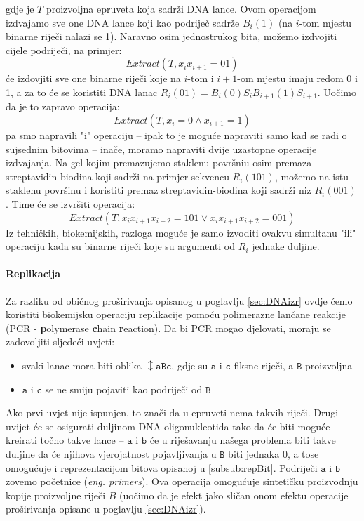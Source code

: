 \documentclass[a4paper,oneside,12pt]{memoir} %
\begin{document}
\begin{spacing}{1.5}
gdje je $T$ proizvoljna epruveta koja sadrži DNA lance. Ovom operacijom izdvajamo sve one DNA lance koji kao podriječ sadrže $B_i(1)$ (na $i$-tom mjestu binarne riječi nalazi se 1). Naravno osim jednostrukog bita, možemo izdvojiti cijele podriječi, na primjer:
\[Extract(T, x_ix_{i+1}=01)\] 
će izdovjiti sve one binarne riječi koje na $i$-tom i $i+1$-om mjestu imaju redom 0 i 1, a za to će se koristiti DNA lanac $R_i(01)=B_i(0)S_{i}B_{i+1}(1)S_{i+1}$. Uočimo da je to zapravo operacija:
\[Extract(T, x_i=0 \wedge x_{i+1}=1)\]
pa smo napravili "i" operaciju -- ipak to je moguće napraviti samo kad se radi o sujsednim bitovima -- inače, moramo napraviti dvije uzastopne operacije izdvajanja. Na gel kojim premazujemo staklenu površniu osim premaza streptavidin-biodina koji sadrži na primjer sekvencu $R_i(101)$, možemo na istu staklenu površinu i koristiti premaz streptavidin-biodina koji sadrži niz $R_i(001)$. Time će se izvršiti operacija:
\[Extract(T, x_ix_{i+1}x_{i+2}=101 \vee x_ix_{i+1}x_{i+2}=001)\] 
Iz tehničkih, biokemijskih, razloga moguće je samo izvoditi ovakvu simultanu "ili" operaciju kada su binarne riječi koje su argumenti od $R_i$ jednake duljine.
\paragraph{Replikacija} Za razliku od običnog proširivanja opisanog u poglavlju \ref{sec:DNAizr} ovdje ćemo koristiti biokemijsku operaciju replikacije pomoću polimerazne lančane reakcije (PCR - \textbf{p}olymerase \textbf{c}hain \textbf{r}eaction). Da bi PCR mogao djelovati, moraju se zadovoljiti sljedeći uvjeti:
\begin{itemize}
\item svaki lanac mora biti oblika $\mathtt{\updownarrow aBc}$, gdje su $\mathtt{a}$ i $\mathtt{c}$ fiksne riječi, a $\mathtt{B}$ proizvoljna
\item $\mathtt{a}$ i $\mathtt{c}$ se ne smiju pojaviti kao podriječi od $\mathtt{B}$
\end{itemize}
Ako prvi uvjet nije ispunjen, to znači da u epruveti nema takvih riječi. Drugi uvijet će se osigurati duljinom DNA oligonukleotida tako da će biti moguće kreirati točno takve lance -- $\mathtt{a}$ i $\mathtt{b}$ će u riješavanju našega problema biti takve duljine da će njihova vjerojatnost pojavljivanja u $\mathtt{B}$ biti jednaka 0, a tose omogućuje i reprezentacijom bitova opisanoj u \ref{subsub:repBit}. Podriječi $\mathtt{a}$ i $\mathtt{b}$ zovemo početnice (\textit{eng. primers}). Ova operacija omogućuje sintetičku proizvodnju kopije proizvoljne riječi $B$ (uočimo da je efekt jako sličan onom efektu operacije proširivanja opisane u poglavlju \ref{sec:DNAizr}).


\end{spacing}
\end{document}
